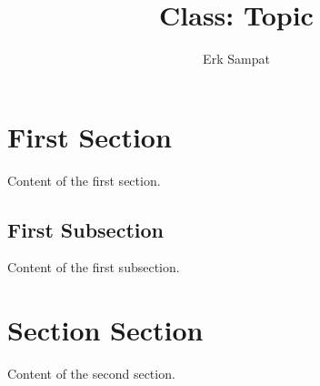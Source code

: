 \title{{\selectfont Class: } Topic}
\author{Erk Sampat}



\maketitle
\section{First Section}
Content of the first section.
\subsection{First Subsection}
Content of the first subsection.
\section{Section Section}
Content of the second section.


